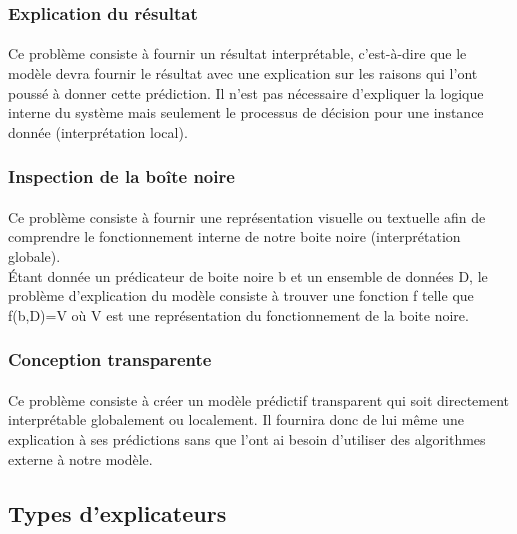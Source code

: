 \subsubsection{Explication du résultat}
\paragraph{}Ce problème consiste à fournir un résultat interprétable, c'est-à-dire que le modèle devra fournir le résultat avec une explication sur les raisons qui l'ont poussé à donner cette prédiction. Il n'est pas nécessaire d'expliquer la logique interne du système mais seulement le processus de décision pour une instance donnée (interprétation local).

\subsubsection{Inspection de la boîte noire}
\paragraph{}Ce problème consiste à fournir une représentation visuelle ou textuelle afin de comprendre le fonctionnement interne de notre boite noire (interprétation globale).\\
Étant donnée un prédicateur de boite noire b et un ensemble de données D, le problème d'explication du modèle consiste à trouver une fonction f telle que f(b,D)=V où V est une représentation du fonctionnement de la boite noire.

\subsubsection{Conception transparente}
\paragraph{}Ce problème consiste à créer un modèle prédictif transparent qui soit directement interprétable globalement ou localement. Il fournira donc de lui même une explication à ses prédictions sans que l'ont ai besoin d'utiliser des algorithmes externe à notre modèle.

\subsection{Types d'explicateurs}
